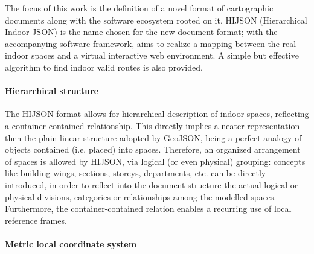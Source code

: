\documentclass{sig-alternate}
\begin{document}
The focus of this work is the definition of a novel format of cartographic
documents along with the software ecosystem rooted on it. HIJSON (Hierarchical
Indoor JSON) is the name chosen for the new document format; with the
accompanying software framework, aims to realize a mapping between the real
indoor spaces and a virtual interactive web environment. A simple but
effective algorithm to find indoor valid routes is also provided.



\paragraph{Hierarchical structure}

The HIJSON format allows for hierarchical description of indoor spaces,
reflecting a container-contained relationship. This directly implies a neater
representation then the plain linear structure adopted by GeoJSON, being a
perfect analogy of objects contained (i.e. placed) into spaces. Therefore, an
organized arrangement of spaces is allowed by HIJSON, via logical (or even
physical) grouping: concepts like building wings, sections, storeys,
departments, etc. can be directly introduced, in order to reflect into the
document structure the actual logical or physical divisions, categories or
relationships among the modelled spaces. Furthermore, the container-contained
relation enables a recurring use of local reference frames.

\paragraph{Metric local coordinate system}
\end{document}
